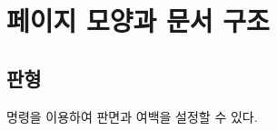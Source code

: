 \documentclass[pairquote, minted]{hzguide}
\begin{document}
\begin{code}
\NewDocumentCommand {}
{
}
\end{code}

\ChapterContentsEnable

\chapter{페이지 모양과 문서 구조}

\section{판형}
\label{sec:layout}

\macro{\LayoutSetup} 명령을 이용하여 판면과 여백을 설정할 수 있다.

\begin{code}
\end{code}
\end{document}

